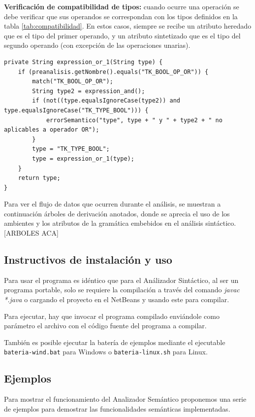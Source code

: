 \textbf{Verificación de compatibilidad de tipos:} cuando ocurre una operación se debe verificar que sus operandos se correspondan con los tipos definidos en la tabla \ref{tab:compatibilidad}. En estos casos, siempre se recibe un atributo heredado que es el tipo del primer operando, y un atributo sintetizado que es el tipo del segundo operando (con excepción de las operaciones unarias).

\begin{verbatim}
private String expression_or_1(String type) {
	if (preanalisis.getNombre().equals("TK_BOOL_OP_OR")) {
		match("TK_BOOL_OP_OR");
		String type2 = expression_and();
		if (not((type.equalsIgnoreCase(type2)) and type.equalsIgnoreCase("TK_TYPE_BOOL"))) {
			errorSemantico("type", type + " y " + type2 + " no aplicables a operador OR");
		}
		type = "TK_TYPE_BOOL";
		type = expression_or_1(type);
	}
	return type;
}
\end{verbatim}

Para ver el flujo de datos que ocurren durante el análisis, se muestran a continuación árboles de derivación anotados, donde se aprecia el uso de los ambientes y los atributos de la gramática  embebidos en el análisis sintáctico.
[ARBOLES ACA]

\subsection{Instructivos de instalación y uso}
Para usar el programa es idéntico que para el Análizador Sintáctico, al ser un programa portable, solo se requiere la compilación a través del comando \emph{javac *.java} o cargando el proyecto en el NetBeans y usando este para compilar.

Para ejecutar, hay que invocar el programa compilado enviándole como parámetro el archivo con el código fuente del programa a compilar.

También es posible ejecutar la batería de ejemplos mediante el ejecutable \texttt{bateria-wind.bat} para Windows o \texttt{bateria-linux.sh} para Linux.

\subsection{Ejemplos}
Para mostrar el funcionamiento del Analizador Semántico proponemos una serie de ejemplos para demostrar las funcionalidades semánticas implementadas.

